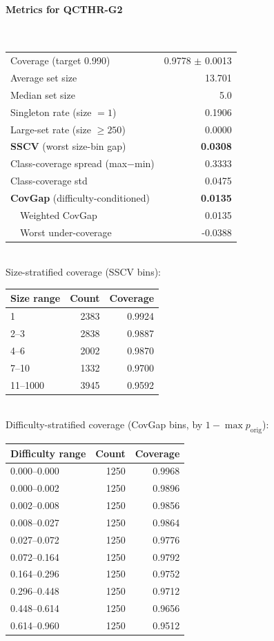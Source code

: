 \documentclass[parskip=half]{scrartcl}
\begin{document}
\paragraph{Metrics for QCTHR-G2}~\\
\begin{tabular}{l r}
\hline
Coverage (target 0.990) & 0.9778 $\pm$ 0.0013 \\
Average set size & 13.701 \\
Median set size & 5.0 \\
Singleton rate (size $=1$) & 0.1906 \\
Large-set rate (size $\geq 250$) & 0.0000 \\
\textbf{SSCV} (worst size-bin gap) & \textbf{0.0308} \\
Class-coverage spread (max$-$min) & 0.3333 \\
Class-coverage std & 0.0475 \\
\textbf{CovGap} (difficulty-conditioned) & \textbf{0.0135} \\
~~Weighted CovGap & 0.0135 \\
~~Worst under-coverage & -0.0388 \\
\hline
\end{tabular}\\[0.5em]
\textsf{\scriptsize Size-stratified coverage (SSCV bins):}\\
\begin{tabular}{l r r}
\hline
Size range & Count & Coverage \\
\hline
1 & 2383 & 0.9924 \\
2--3 & 2838 & 0.9887 \\
4--6 & 2002 & 0.9870 \\
7--10 & 1332 & 0.9700 \\
11--1000 & 3945 & 0.9592 \\
\hline
\end{tabular}\\[0.5em]
\textsf{\scriptsize Difficulty-stratified coverage (CovGap bins, by $1-\max p_{\mathrm{orig}}$):}\\
\begin{tabular}{l r r}
\hline
Difficulty range & Count & Coverage \\
\hline
0.000--0.000 & 1250 & 0.9968 \\
0.000--0.002 & 1250 & 0.9896 \\
0.002--0.008 & 1250 & 0.9856 \\
0.008--0.027 & 1250 & 0.9864 \\
0.027--0.072 & 1250 & 0.9776 \\
0.072--0.164 & 1250 & 0.9792 \\
0.164--0.296 & 1250 & 0.9752 \\
0.296--0.448 & 1250 & 0.9712 \\
0.448--0.614 & 1250 & 0.9656 \\
0.614--0.960 & 1250 & 0.9512 \\
\hline
\end{tabular}\\[0.5em]
\end{document}
